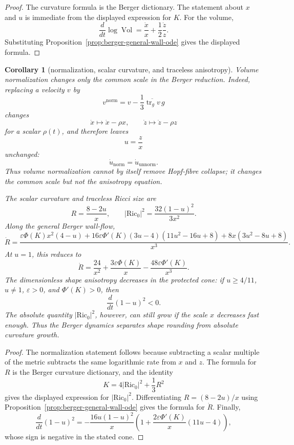 \documentclass[11pt]{amsart}
\newtheorem{corollary}{Corollary}
\newcommand{\Ric}{\mathrm{Ric}}
\newcommand{\tr}{\operatorname{tr}}
\newcommand{\Vol}{\operatorname{Vol}}
\begin{document}
\begin{proof}
The curvature formula is the Berger dictionary.  The statement about \(x\) and
\(u\) is immediate from the displayed expression for \(K\).  For the volume,
\[
        \frac{d}{dt}\log\Vol
        =
        \frac{\dot x}{x}
        +
        \frac12\frac{\dot z}{z}.
\]
Substituting Proposition~\ref{prop:berger-general-wall-ode} gives the displayed
formula.
\end{proof}

\begin{corollary}[normalization, scalar curvature, and traceless anisotropy]\label{cor:berger-scalar-anisotropy}
Volume normalization changes only the common scale in the Berger reduction.
Indeed, replacing a velocity \(v\) by
\[
        v^{\mathrm{norm}}
        =
        v-\frac13\overline{\tr_g v}\,g
\]
changes
\[
        \dot x\mapsto \dot x-\rho x,\qquad
        \dot z\mapsto \dot z-\rho z
\]
for a scalar \(\rho(t)\), and therefore leaves
\[
        u=\frac{z}{x}
\]
unchanged:
\[
\boxed{
        \dot u_{\mathrm{norm}}=\dot u_{\mathrm{unnorm}}.
}
\]
Thus volume normalization cannot by itself remove Hopf-fibre collapse; it
changes the common scale but not the anisotropy equation.

The scalar curvature and traceless Ricci size are
\[
        R=\frac{8-2u}{x},
        \qquad
\boxed{
        |\Ric_0|^2=\frac{32(1-u)^2}{3x^2}.
}
\]
Along the general Berger wall-flow,
\[
\boxed{
        \dot R
        =
        \frac{
        \varepsilon\Phi(K)x^2(4-u)
        +
        16\varepsilon\Phi'(K)(3u-4)(11u^2-16u+8)
        +
        8x(3u^2-8u+8)
        }{x^3}.
}
\]
At \(u=1\), this reduces to
\[
\boxed{
        \dot R
        =
        \frac{24}{x^2}
        +
        \frac{3\varepsilon\Phi(K)}{x}
        -
        \frac{48\varepsilon\Phi'(K)}{x^3}.
}
\]
The dimensionless shape anisotropy decreases in the protected cone:
if \(u\ge4/11\), \(u\ne1\), \(\varepsilon>0\), and \(\Phi'(K)>0\), then
\[
\boxed{
        \frac{d}{dt}(1-u)^2<0.
}
\]
The absolute quantity \(|\Ric_0|^2\), however, can still grow if the scale
\(x\) decreases fast enough.  Thus the Berger dynamics separates shape
rounding from absolute curvature growth.
\end{corollary}

\begin{proof}
The normalization statement follows because subtracting a scalar multiple of
the metric subtracts the same logarithmic rate from \(x\) and \(z\).  The
formula for \(R\) is the Berger curvature dictionary, and the identity
\[
        K=4|\Ric_0|^2+\frac13R^2
\]
gives the displayed expression for \(|\Ric_0|^2\).  Differentiating
\(R=(8-2u)/x\) using Proposition~\ref{prop:berger-general-wall-ode} gives the
formula for \(\dot R\).  Finally,
\[
        \frac{d}{dt}(1-u)^2
        =
        -\frac{16u(1-u)^2}{x}
        \left(
        1+\frac{2\varepsilon\Phi'(K)}{x}(11u-4)
        \right),
\]
whose sign is negative in the stated cone.
\end{proof}
\end{document}
